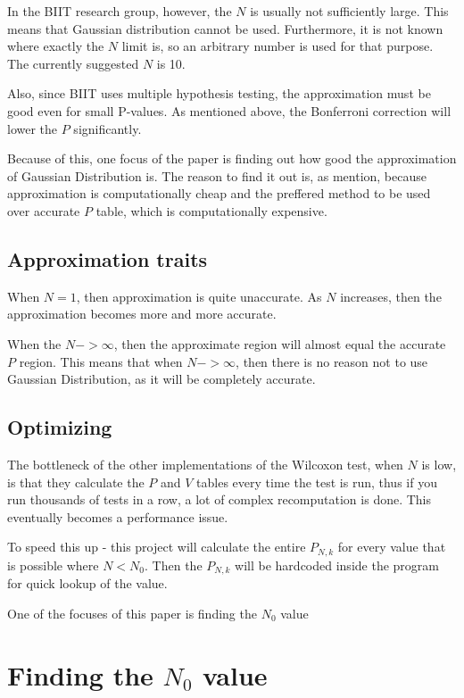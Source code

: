 \documentclass[12pt]{article}
\begin{document}
In the BIIT research group, however, the $N$ is usually not sufficiently large. This means that Gaussian distribution cannot be used. Furthermore, it is not known where exactly the $N$ limit is, so an arbitrary number is used for that purpose. The currently suggested $N$ is 10.

Also, since BIIT uses multiple hypothesis testing, the approximation must be good even for small P-values. As mentioned above, the Bonferroni correction will lower the $P$ significantly.

Because of this, one focus of the paper is finding out how good the approximation of Gaussian Distribution is. The reason to find it out is, as mention, because approximation is computationally cheap and the preffered method to be used over accurate $P$ table, which is computationally expensive.

\subsection{Approximation traits}
When $N = 1$, then approximation is quite unaccurate. As $N$ increases, then the approximation becomes more and more accurate.

When the $N->\infty$, then the approximate region will almost equal the accurate $P$ region. This means that when $N->\infty$, then there is no reason not to use Gaussian Distribution, as it will be completely accurate.

\subsection{Optimizing}

The bottleneck of the other implementations of the Wilcoxon test, when $N$ is low, is that they calculate the $P$ and $V$ tables every time the test is run, thus if you run thousands of tests in a row, a lot of complex recomputation is done. This eventually becomes a performance issue.

To speed this up - this project will calculate the entire $P_{N, k}$ for every value that is possible where $N < N_0$. Then the $P_{N, k}$ will be hardcoded inside the program for quick lookup of the value.

One of the focuses of this paper is finding the $N_0$ value

\newpage

\section{Finding the $N_0$ value}
\end{document}
